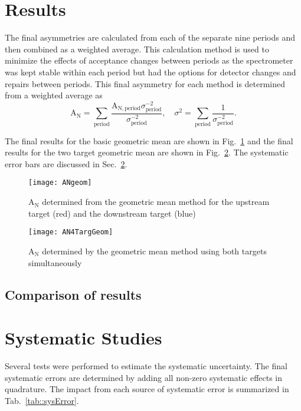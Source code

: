 \section{Results}
The final asymmetries are calculated from each of the separate nine periods and
then combined as a weighted average.  This calculation method is used to
minimize the effects of acceptance changes between periods as the spectrometer
was kept stable within each period but had the options for detector changes and
repairs between periods.  This final asymmetry for each method is determined
from a weighted average as
\begin{equation}
  \label{equ::wAvg}
  \mathrm{A}_{\mathrm{N}} = \sum_{\mathrm{period}}
  \frac{\mathrm{A}_{\mathrm{N},\mathrm{period}}\sigma^{-2}_{\mathrm{period}}}{\sigma^{-2}_{\mathrm{period}}},
  \quad \sigma^2 = \sum_{\mathrm{period}}
  \frac{1}{\sigma^{-2}_{\mathrm{period}}}.
\end{equation}

\noindent
The final results for the basic geometric mean are shown in
Fig.~\ref{fig::ANgeom} and the final results for the two target geometric mean
are shown in Fig.~\ref{fig::AN4TargGeom}.  The systematic error bars are
discussed in Sec.~\ref{sec::systematics}.

\begin{figure}[h!t]
  \begin{center}
    \texttt{[image: ANgeom]} 
    \caption{A$_{\mathrm{N}}$ determined from the geometric mean method for the
      upstream target (red) and the downstream target (blue)}
    \label{fig::ANgeom}
  \end{center}
\end{figure}

\begin{figure}[h!t]
  \begin{center}
    \texttt{[image: AN4TargGeom]}
    \caption{A$_{\mathrm{N}}$ determined by the geometric mean method using both
      targets simultaneously}
    \label{fig::AN4TargGeom}
  \end{center}
\end{figure}

\subsection{Comparison of results}


\section{Systematic Studies} \label{sec::systematics}
Several tests were performed to estimate the systematic uncertainty.  The final
systematic errors are determined by adding all non-zero systematic effects in
quadrature.  The impact from each source of systematic error is summarized in
Tab.~\ref{tab::sysError}.  

